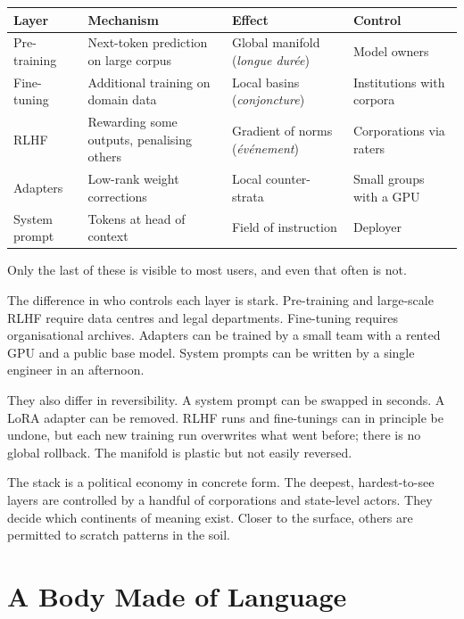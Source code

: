 \documentclass[12pt,a4paper]{article}
\begin{document}
\begin{formalbox}[title={Depths of Intervention}]
\begin{tabular}{@{}llll@{}}
\toprule
\textbf{Layer} & \textbf{Mechanism} & \textbf{Effect} & \textbf{Control} \\
\midrule
Pre-training   & Next-token prediction on large corpus & Global manifold (\emph{longue dur\'{e}e}) & Model owners \\
Fine-tuning    & Additional training on domain data    & Local basins (\emph{conjoncture})         & Institutions with corpora \\
RLHF           & Rewarding some outputs, penalising others & Gradient of norms (\emph{\'{e}v\'{e}nement}) & Corporations via raters \\
Adapters       & Low-rank weight corrections           & Local counter-strata                      & Small groups with a GPU \\
System prompt  & Tokens at head of context             & Field of instruction                      & Deployer \\
\bottomrule
\end{tabular}
\end{formalbox}

Only the last of these is visible to most users, and even that often is not.

The difference in who controls each layer is stark. Pre-training and large-scale RLHF require data centres and legal departments. Fine-tuning requires organisational archives. Adapters can be trained by a small team with a rented GPU and a public base model. System prompts can be written by a single engineer in an afternoon.

They also differ in reversibility. A system prompt can be swapped in seconds. A LoRA adapter can be removed. RLHF runs and fine-tunings can in principle be undone, but each new training run overwrites what went before; there is no global rollback. The manifold is plastic but not easily reversed.

The stack is a political economy in concrete form. The deepest, hardest-to-see layers are controlled by a handful of corporations and state-level actors. They decide which continents of meaning exist. Closer to the surface, others are permitted to scratch patterns in the soil.

\section{A Body Made of Language}
\end{document}
